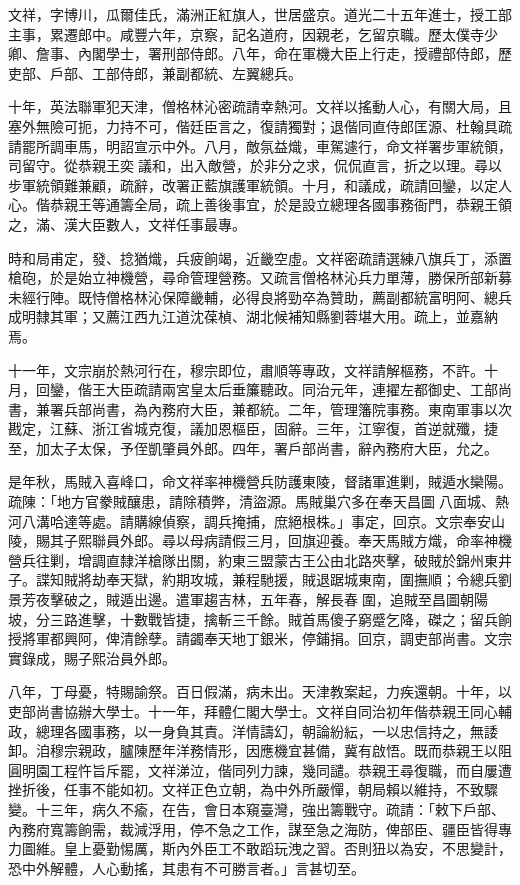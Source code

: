 \begin{pinyinscope}
文祥，字博川，瓜爾佳氏，滿洲正紅旗人，世居盛京。道光二十五年進士，授工部主事，累遷郎中。咸豐六年，京察，記名道府，因親老，乞留京職。歷太僕寺少卿、詹事、內閣學士，署刑部侍郎。八年，命在軍機大臣上行走，授禮部侍郎，歷吏部、戶部、工部侍郎，兼副都統、左翼總兵。

十年，英法聯軍犯天津，僧格林沁密疏請幸熱河。文祥以搖動人心，有關大局，且塞外無險可扼，力持不可，偕廷臣言之，復請獨對；退偕同直侍郎匡源、杜翰具疏請罷所調車馬，明詔宣示中外。八月，敵氛益熾，車駕遽行，命文祥署步軍統領，司留守。從恭親王奕議和，出入敵營，於非分之求，侃侃直言，折之以理。尋以步軍統領難兼顧，疏辭，改署正藍旗護軍統領。十月，和議成，疏請回鑾，以定人心。偕恭親王等通籌全局，疏上善後事宜，於是設立總理各國事務衙門，恭親王領之，滿、漢大臣數人，文祥任事最專。

時和局甫定，發、捻猶熾，兵疲餉竭，近畿空虛。文祥密疏請選練八旗兵丁，添置槍砲，於是始立神機營，尋命管理營務。又疏言僧格林沁兵力單薄，勝保所部新募未經行陣。既恃僧格林沁保障畿輔，必得良將勁卒為贊助，薦副都統富明阿、總兵成明隸其軍；又薦江西九江道沈葆楨、湖北候補知縣劉蓉堪大用。疏上，並嘉納焉。

十一年，文宗崩於熱河行在，穆宗即位，肅順等專政，文祥請解樞務，不許。十月，回鑾，偕王大臣疏請兩宮皇太后垂簾聽政。同治元年，連擢左都御史、工部尚書，兼署兵部尚書，為內務府大臣，兼都統。二年，管理籓院事務。東南軍事以次戡定，江蘇、浙江省城克復，議加恩樞臣，固辭。三年，江寧復，首逆就殲，捷至，加太子太保，予侄凱肇員外郎。四年，署戶部尚書，辭內務府大臣，允之。

是年秋，馬賊入喜峰口，命文祥率神機營兵防護東陵，督諸軍進剿，賊遁水欒陽。疏陳：「地方官豢賊釀患，請除積弊，清盜源。馬賊巢穴多在奉天昌圖八面城、熱河八溝哈達等處。請購線偵察，調兵掩捕，庶絕根株。」事定，回京。文宗奉安山陵，賜其子熙聯員外郎。尋以母病請假三月，回旗迎養。奉天馬賊方熾，命率神機營兵往剿，增調直隸洋槍隊出關，約東三盟蒙古王公由北路夾擊，破賊於錦州東井子。諜知賊將劫奉天獄，約期攻城，兼程馳援，賊退踞城東南，圍撫順；令總兵劉景芳夜擊破之，賊遁出邊。遣軍趨吉林，五年春，解長春圍，追賊至昌圖朝陽坡，分三路進擊，十數戰皆捷，擒斬三千餘。賊首馬傻子窮蹙乞降，磔之；留兵餉授將軍都興阿，俾清餘孽。請蠲奉天地丁銀米，停鋪捐。回京，調吏部尚書。文宗實錄成，賜子熙治員外郎。

八年，丁母憂，特賜諭祭。百日假滿，病未出。天津教案起，力疾還朝。十年，以吏部尚書協辦大學士。十一年，拜體仁閣大學士。文祥自同治初年偕恭親王同心輔政，總理各國事務，以一身負其責。洋情譸幻，朝論紛紜，一以忠信持之，無諉卸。洎穆宗親政，臚陳歷年洋務情形，因應機宜甚備，冀有啟悟。既而恭親王以阻圓明園工程忤旨斥罷，文祥涕泣，偕同列力諫，幾同譴。恭親王尋復職，而自屢遭挫折後，任事不能如初。文祥正色立朝，為中外所嚴憚，朝局賴以維持，不致驟變。十三年，病久不瘉，在告，會日本窺臺灣，強出籌戰守。疏請：「敕下戶部、內務府寬籌餉需，裁減浮用，停不急之工作，謀至急之海防，俾部臣、疆臣皆得專力圖維。皇上憂勤惕厲，斯內外臣工不敢蹈玩洩之習。否則狃以為安，不思變計，恐中外解體，人心動搖，其患有不可勝言者。」言甚切至。


\end{pinyinscope}
